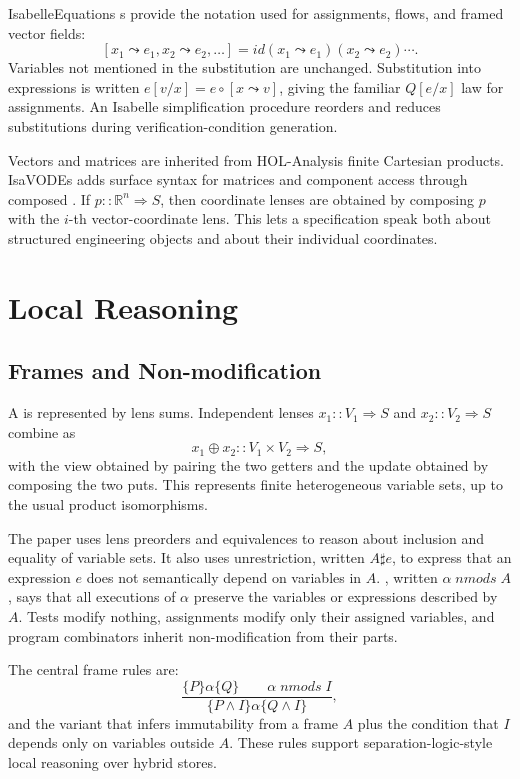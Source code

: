 \documentclass[hidelinks]{article}
\begin{document}
\begin{smodule}[title={IsaVODEs: Interactive Verification of Cyber-Physical Systems at Scale}]{IsabelleEquations}
s provide the notation used for assignments, flows, and framed vector fields:
\[
    [x_1\leadsto e_1,x_2\leadsto e_2,\ldots]
    = id(x_1\leadsto e_1)(x_2\leadsto e_2)\cdots .
\]
Variables not mentioned in the substitution are unchanged.
Substitution into expressions is written \(e[v/x]=e\circ[x\leadsto v]\), giving the familiar \(Q[e/x]\) law for assignments.
An Isabelle simplification procedure reorders and reduces substitutions during verification-condition generation.

Vectors and matrices are inherited from HOL-Analysis finite Cartesian products.
IsaVODEs adds surface syntax for matrices and component access through composed .
If \(p::\mathbb{R}^n\Rightarrow S\), then coordinate lenses are obtained by composing \(p\) with the \(i\)-th vector-coordinate lens.
This lets a specification speak both about structured engineering objects and about their individual coordinates.

\section{Local Reasoning}

\subsection{Frames and Non-modification}

A  is represented by lens sums.
Independent lenses \(x_1::V_1\Rightarrow S\) and \(x_2::V_2\Rightarrow S\) combine as
\[
    x_1\oplus x_2::V_1\times V_2\Rightarrow S,
\]
with the view obtained by pairing the two getters and the update obtained by composing the two puts.
This represents finite heterogeneous variable sets, up to the usual product isomorphisms.

The paper uses lens preorders and equivalences to reason about inclusion and equality of variable sets.
It also uses unrestriction, written \(A\sharp e\), to express that an expression \(e\) does not semantically depend on variables in \(A\).
, written \(\alpha\;nmods\;A\), says that all executions of \(\alpha\) preserve the variables or expressions described by \(A\).
Tests modify nothing, assignments modify only their assigned variables, and program combinators inherit non-modification from their parts.

The central frame rules are:
\[
    \frac{\{P\}\alpha\{Q\}\qquad \alpha\;nmods\;I}
         {\{P\wedge I\}\alpha\{Q\wedge I\}},
\]
and the variant that infers immutability from a frame \(A\) plus the condition that \(I\) depends only on variables outside \(A\).
These rules support separation-logic-style local reasoning over hybrid stores.


\end{smodule}
\end{document}
